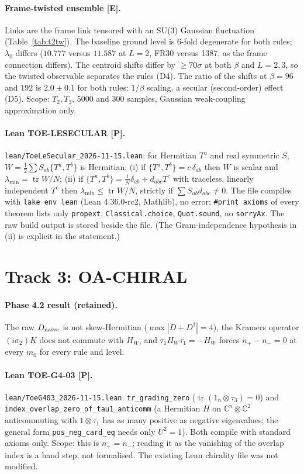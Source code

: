 \documentclass[10pt]{article}
\newcommand{\lab}[1]{\textbf{[#1]}}
\begin{document}
\paragraph{Frame-twisted ensemble \lab{E}.} Links are the frame link tensored with an SU(3) Gaussian fluctuation (Table~\ref{tab:t2tw}). The baseline ground level is 6-fold degenerate for both rules; $\lambda_0$ differs ($10.777$ versus $11.587$ at $L=2$, FR30 versus 1387, as the frame connection differs). The centroid shifts differ by $\ge70\sigma$ at both $\beta$ and $L=2,3$, so the twisted observable separates the rules (D4). The ratio of the shifts at $\beta=96$ and $192$ is $2.0\pm0.1$ for both rules: $1/\beta$ scaling, a secular (second-order) effect (D5). Scope: $T_2,T_3$, 5000 and 300 samples, Gaussian weak-coupling approximation only.


\paragraph{Lean TOE-LESECULAR \lab{P}.} \texttt{lean/ToeLeSecular\_2026-11-15.lean}: for Hermitian $T^a$ and real symmetric $S$, $W=\tfrac12\sum S_{ab}\{T^a,T^b\}$ is Hermitian; (i) if $\{T^a,T^b\}=c\,\delta_{ab}$ then $W$ is scalar and $\lambda_{\min}=\operatorname{tr}W/N$; (ii) if $\{T^a,T^b\}=\tfrac1N\delta_{ab}+d_{abc}T^c$ with traceless, linearly independent $T^c$ then $\lambda_{\min}\le\operatorname{tr}W/N$, strictly if $\sum S_{ab}d_{abc}\ne0$. The file compiles with \texttt{lake env lean} (Lean 4.36.0-rc2, Mathlib), no error; \texttt{\#print axioms} of every theorem lists only \texttt{propext}, \texttt{Classical.choice}, \texttt{Quot.sound}, no \texttt{sorryAx}. The raw build output is stored beside the file. (The Gram-independence hypothesis in (ii) is explicit in the statement.)

\section{Track 3: OA-CHIRAL}\label{sec:t3}
\paragraph{Phase 4.2 result (retained).} The raw $D_{\rm naive}$ is not skew-Hermitian ($\max|D+D^\dagger|=4$), the Kramers operator $(i\sigma_2)K$ does not commute with $H_W$, and $\tau_1H_W\tau_1=-H_W$ forces $n_+-n_-=0$ at every $m_0$ for every rule and level.


\paragraph{Lean TOE-G4-03 \lab{P}.} \texttt{lean/ToeG403\_2026-11-15.lean}: \texttt{tr\_grading\_zero} ($\operatorname{tr}(1_n\otimes\tau_3)=0$) and \texttt{index\_overlap\_zero\_of\_tau1\_anticomm} (a Hermitian $H$ on $\mathbb C^n\otimes\mathbb C^2$ anticommuting with $1\otimes\tau_1$ has as many positive as negative eigenvalues; the general form \texttt{pos\_neg\_card\_eq} needs only $U^2=1$). Both compile with standard axioms only. Scope: this is $n_+=n_-$; reading it as the vanishing of the overlap index is a hand step, not formalised. The existing Lean chirality file was not modified.
\end{document}
